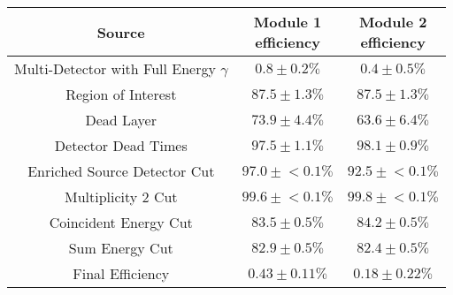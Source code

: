 \begin{tabular}{|c|c|c|}
\hline
  Source & \makecell{Module 1\\efficiency} & \makecell{Module 2\\efficiency} \\
\hline
  \makecell{Multi-Detector with\\Full Energy $\gamma$} & $0.8 \pm 0.2\%$ & $0.4 \pm 0.5\%$ \\
  Region of Interest & $87.5 \pm 1.3\%$ & $87.5 \pm 1.3\%$ \\
  Dead Layer & $73.9 \pm 4.4\%$ & $63.6 \pm 6.4\%$ \\
  Detector Dead Times & $97.5 \pm 1.1\%$ & $98.1 \pm 0.9\%$ \\
  Enriched Source Detector Cut & $97.0 \pm{}<\!0.1\%$ & $92.5 \pm{}<\!0.1\%$ \\
  Multiplicity 2 Cut & $99.6 \pm{}<\!0.1\%$ & $99.8 \pm{}<\!0.1\%$ \\
  Coincident Energy Cut & $83.5 \pm 0.5\%$ & $84.2 \pm 0.5\%$ \\
  Sum Energy Cut & $82.9 \pm 0.5\%$ & $82.4 \pm 0.5\%$ \\
  \hline Final Efficiency & $0.43 \pm 0.11\%$ & $0.18 \pm 0.22\%$ \\
\hline
\end{tabular}
